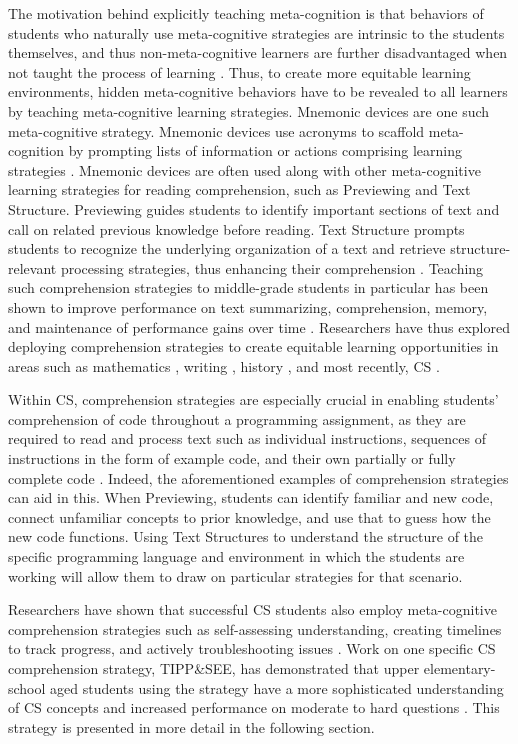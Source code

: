 \documentclass[sigconf,manuscript,review,anonymous]{acmart} %
\def\ts{TIPP\&SEE}
\begin{document}
The motivation behind explicitly teaching meta-cognition is that behaviors of students who naturally use meta-cognitive strategies are intrinsic to the students themselves, and thus non-meta-cognitive learners are further disadvantaged when not taught the process of learning \cite{cubukcu2008enhancing}. Thus, to create more equitable learning environments, hidden meta-cognitive behaviors have to be revealed to all learners by teaching meta-cognitive learning strategies. Mnemonic devices are one such meta-cognitive strategy. Mnemonic devices use acronyms to scaffold meta-cognition by prompting lists of information or actions comprising learning strategies \cite{scruggs2010mnemonic}. Mnemonic devices are often used along with other meta-cognitive learning strategies for reading comprehension, such as Previewing and Text Structure. Previewing guides students to identify important sections of text and call on related previous knowledge before reading. Text Structure prompts students to recognize the underlying organization of a text and retrieve structure-relevant processing strategies, thus enhancing their comprehension \cite{gersten2001teaching}. Teaching such comprehension strategies to middle-grade students in particular has been shown to improve performance on text summarizing, comprehension, memory, and maintenance of performance gains over time \cite{brown1984instructing}. Researchers have thus explored deploying comprehension strategies to create equitable learning opportunities in areas such as mathematics \cite{montague1992effects}, writing \cite{graham2012meta}, history \cite{de2005effects}, and most recently, CS \cite{franklin2020Scratchencore, salac2020tippnsee}.

Within CS, comprehension strategies are especially crucial in enabling students' comprehension of code throughout a programming assignment, as they are required to read and process text such as individual instructions, sequences of instructions in the form of example code, and their own partially or fully complete code \cite{tippnsee}. Indeed, the aforementioned examples of comprehension strategies can aid in this. When Previewing, students can identify familiar and new code, connect unfamiliar concepts to prior knowledge, and use that to guess how the new code functions. Using Text Structures to understand the structure of the specific programming language and environment in which the students are working will allow them to draw on particular strategies for that scenario. 

Researchers have shown that successful CS students also employ meta-cognitive comprehension strategies such as self-assessing understanding, creating timelines to track progress, and actively troubleshooting issues \cite{rum2018strategies}. Work on one specific CS comprehension strategy, \ts{}, has demonstrated that upper elementary-school aged students using the strategy have a more sophisticated understanding of CS concepts and increased performance on moderate to hard questions \cite{tippnsee}. This strategy is presented in more detail in the following section.
\end{document}
